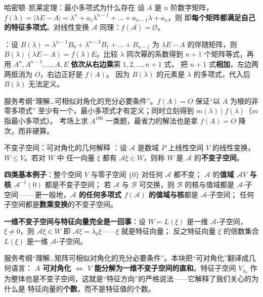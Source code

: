 \begin{fdeep}{哈密顿--凯莱定理：最小多项式为什么存在}
设 $A$ 是 $n$ 阶数字矩阵，$f(\lambda)=|\lambda E-A|=\lambda^{n}+a_{1}\lambda^{n-1}+\dots+a_{n-1}\lambda+a_{n}$，则
即\textbf{每个矩阵都满足自己的特征多项式}。对线性变换 $\mathscr{A}$ 同理：$f(\mathscr{A})=\mathscr{O}$。

：设 $B(\lambda)=\lambda^{n-1}B_{0}+\lambda^{n-2}B_{1}+\dots+B_{n-1}$ 为
$\lambda E-A$ 的伴随矩阵，则 $B(\lambda)(\lambda E-A)=f(\lambda)E$。比较 $\lambda$ 同次幂的系数得到
$n+1$ 个矩阵等式，再用 $A^{n},A^{n-1},\dots,A,E$ \textbf{依次从右边乘}第 $1,2,\dots,n+1$ 式，
把 $n+1$ 式\textbf{相加}，左边两两抵消为 $O$，右边正好是 $f(A)$。
因为 $B(\lambda)$ 的元素是 $\lambda$ 的多项式，代入后 $B(\lambda)$ 无法定义。

\fbref{}服务考纲“理解…可相似对角化的充分必要条件”。$f(A)=O$ 保证“以 $A$ 为根的非零多项式”
至少有一个，最小多项式才有定义；同时立刻得到 $m(\lambda)\mid f(\lambda)$（$m$ 指最小多项式）。
考场上求 $A^{100}$ 一类题，最省力的解法也是拿 $f(A)=O$ 降次，而非硬算。
\end{fdeep}

\begin{fdeep}{不变子空间：可对角化的几何解释}
：设 $\mathscr{A}$ 是数域 $P$ 上线性空间 $V$ 的线性变换，$W\le V$。若对 $W$ 中
任一向量 $\xi$ 都有 $\mathscr{A}\xi\in W$，则称 $W$ 是 $\mathscr{A}$ 的\textbf{不变子空间}。

\textbf{四类基本例子}：整个空间 $V$ 与零子空间 $\{0\}$ 对任何 $\mathscr{A}$ 都不变；
$\mathscr{A}$ 的\textbf{值域 $\mathscr{A}V$ 与核 $\mathscr{A}^{-1}(0)$} 都是不变子空间；
若 $\mathscr{A}$ 与 $\mathscr{B}$ 可交换，则 $\mathscr{B}$ 的核与值域都是 $\mathscr{A}$-子空间
——更一般地，\textbf{$\mathscr{A}$ 的任何多项式 $f(\mathscr{A})$ 的值域与核}都是 $\mathscr{A}$-子空间；
任何子空间都是\textbf{数乘变换}的不变子空间。

\textbf{一维不变子空间与特征向量完全是一回事}：设 $W=L(\xi)$ 是一维 $\mathscr{A}$-子空间，
$\xi\ne0$，则 $\mathscr{A}\xi\in W$ 即 $\mathscr{A}\xi=\lambda_0\xi$——$\xi$ 就是特征向量；
反之特征向量 $\xi$ 的倍数集合 $L(\xi)$ 是一维 $\mathscr{A}$-子空间。

\fbref{}服务考纲“理解…矩阵可相似对角化的充分必要条件”。本块把“可对角化”翻译成几何语言：
\textbf{$A$ 可对角化 $\iff$ $V$ 能分解为一维不变子空间的直和}。特征子空间 $V_{\lambda_0}$
作为整体也是不变子空间，这就是“特征方向”的严格说法——它解释了我们关心的为什么是
特征向量的\textbf{个数}，而不是特征值的个数。
\end{fdeep}

